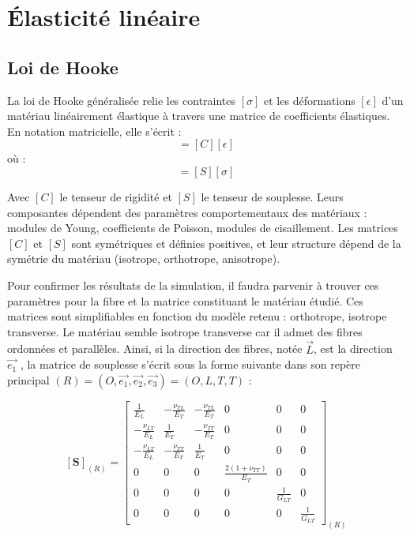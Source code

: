\documentclass[a4paper,11pt]{article}
\begin{document}
\section{Élasticité linéaire}

\subsection{Loi de Hooke}

La loi de Hooke généralisée relie les contraintes $[\sigma]$ et les déformations $[\epsilon]$ d'un matériau linéairement élastique à travers une matrice de coefficients élastiques. En notation matricielle, elle s'écrit :
\begin{equation}
    [\sigma] = [C][\epsilon]
\end{equation}
où :
\begin{equation}
    [\epsilon] = [S][\sigma]
\end{equation}

Avec $[C]$ le tenseur de rigidité et $[S]$ le tenseur de souplesse. Leurs composantes dépendent des paramètres comportementaux des matériaux : modules de Young, coefficients de Poisson, modules de cisaillement. Les matrices $[C]$ et $[S]$ sont symétriques et définies positives, et leur structure dépend de la symétrie du matériau (isotrope, orthotrope, anisotrope).

Pour confirmer les résultats de la simulation, il faudra parvenir à trouver ces paramètres pour la fibre et la matrice constituant le matériau étudié. Ces matrices sont simplifiables en fonction du modèle retenu : orthotrope, isotrope transverse. Le matériau semble isotrope transverse car il admet des fibres ordonnées et parallèles. Ainsi, si la direction des fibres, notée $\vec{L}$, est la direction $\vec{e_1}$ , la matrice de souplesse s'écrit sous la forme suivante dans son repère principal $(R) = (O,\vec{e_1},\vec{e_2},\vec{e_3}) = (O,L,T,T)$ :

\begin{equation}
    \mathbf{[S]}_{(R)} =
    \left[
    \begin{array}{cccccc}
    \frac{1}{E_L} & -\frac{\nu_{TL}}{E_T} & -\frac{\nu_{TL}}{E_T} & 0 & 0 & 0 \\
    -\frac{\nu_{LT}}{E_L} & \frac{1}{E_T} & -\frac{\nu_{TT}}{E_T} & 0 & 0 & 0 \\
    -\frac{\nu_{LT}}{E_L} & -\frac{\nu_{TT}}{E_T} & \frac{1}{E_T} & 0 & 0 & 0 \\
    0 & 0 & 0 & \frac{2(1+\nu_{TT})}{E_T} & 0 & 0 \\
    0 & 0 & 0 & 0 & \frac{1}{G_{LT}} & 0 \\
    0 & 0 & 0 & 0 & 0 & \frac{1}{G_{LT}}
    \end{array}
    \right]_{(R)}
    \label{eq:souplesse_isotrope_transverse}
\end{equation}
\end{document}

